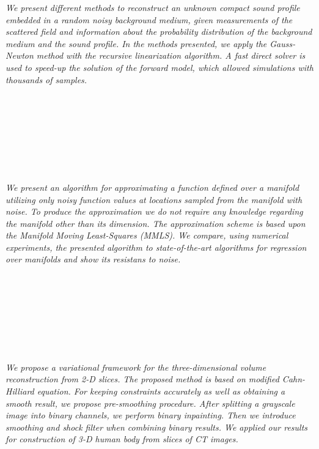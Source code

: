   \begin{multicols}{2}
      \textit{We present different methods to reconstruct an unknown compact sound profile embedded in a random noisy background medium, given measurements of the scattered field and information about the probability distribution of the background medium and the sound profile. In the methods presented, we apply the Gauss-Newton method with the recursive linearization algorithm. A fast direct solver is used to speed-up the solution of the forward model, which allowed simulations with thousands of samples.}\\
\\ 
        \\
        \\\\
        \\
        \\\\
\\
      \textit{We present an algorithm for approximating a function defined over a manifold utilizing only noisy function values at locations sampled from the manifold with noise. To produce the approximation we do not require any knowledge regarding the manifold other than its dimension. The approximation scheme is based upon the Manifold Moving Least-Squares (MMLS). We compare, using numerical experiments, the presented algorithm to state-of-the-art algorithms for regression over manifolds and show its resistans to noise.}\\
\\ 
        \\
        \\\\
        \\
        \\\\
\\
      \textit{We propose a variational framework for the three-dimensional volume reconstruction from 2-D slices. The proposed method is based on modified Cahn-Hilliard equation. For keeping constraints accurately as well as obtaining a smooth result, we propose pre-smoothing procedure. After splitting a grayscale image into binary channels, we perform binary inpainting. Then we introduce smoothing and shock filter when combining binary results. We applied our results for construction of 3-D human body from slices of CT images.}\\

\end{multicols}
